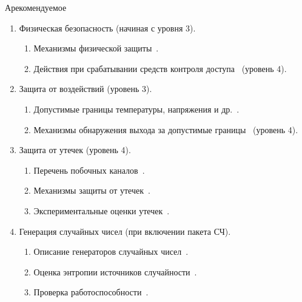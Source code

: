 \begin{appendix}{А}{рекомендуемое}
\begin{enumerate}
\begin{enumerate}
\item
Структура записей аудита~.

\item
Обработка переполнения журнала аудита~.
\end{enumerate}

\item
Физическая безопасность (начиная с уровня 3).

\begin{enumerate}
\item
Механизмы физической защиты~.

\item
Действия при срабатывании средств контроля 
доступа~ (уровень 4). 
\end{enumerate}

\item
Защита от воздействий (уровень 3).

\begin{enumerate}
\item
Допустимые границы температуры, напряжения и др.~.

\item
Механизмы обнаружения выхода за допустимые границы~
(уровень 4).
\end{enumerate}

\item
Защита от утечек (уровень 4).

\begin{enumerate}
\item
Перечень побочных каналов~.

\item
Механизмы защиты от утечек~.

\item
Экспериментальные оценки утечек~.
\end{enumerate}

\item
Генерация случайных чисел (при включении пакета СЧ).

\begin{enumerate}
\item
Описание генераторов случайных чисел~.

\item
Оценка энтропии источников случайности~.

\item
Проверка работоспособности~.


\end{enumerate}
\end{enumerate}
\end{appendix}
